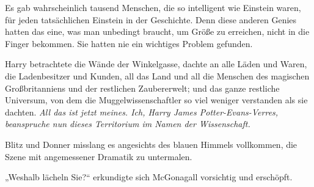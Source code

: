 Es gab wahrscheinlich tausend Menschen, die so intelligent wie Einstein waren, für jeden tatsächlichen Einstein in der Geschichte. Denn diese anderen Genies hatten das eine, was man unbedingt braucht, um Größe zu erreichen, nicht in die Finger bekommen. Sie hatten nie ein wichtiges Problem gefunden.

Harry betrachtete die Wände der Winkelgasse, dachte an alle Läden und Waren, die Ladenbesitzer und Kunden, all das Land und all die Menschen des magischen Großbritanniens und der restlichen Zaubererwelt; und das ganze restliche Universum, von dem die Muggelwissenschaftler so viel weniger verstanden als sie dachten. \emph{All das ist jetzt meines. Ich, Harry James Potter-Evans-Verres, beanspruche nun dieses Territorium im Namen der Wissenschaft.}

Blitz und Donner misslang es angesichts des blauen Himmels vollkommen, die Szene mit angemessener Dramatik zu untermalen.

„Weshalb lächeln Sie?“ erkundigte sich McGonagall vorsichtig und erschöpft.

